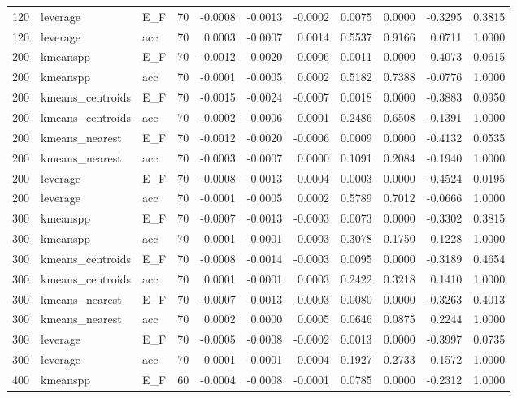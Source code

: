 \begin{table}
\begin{tabular}{rllrrrrrrrr}
120 & leverage & E\_F & 70 & -0.0008 & -0.0013 & -0.0002 & 0.0075 & 0.0000 & -0.3295 & 0.3815 \\
120 & leverage & acc & 70 & 0.0003 & -0.0007 & 0.0014 & 0.5537 & 0.9166 & 0.0711 & 1.0000 \\
200 & kmeanspp & E\_F & 70 & -0.0012 & -0.0020 & -0.0006 & 0.0011 & 0.0000 & -0.4073 & 0.0615 \\
200 & kmeanspp & acc & 70 & -0.0001 & -0.0005 & 0.0002 & 0.5182 & 0.7388 & -0.0776 & 1.0000 \\
200 & kmeans\_centroids & E\_F & 70 & -0.0015 & -0.0024 & -0.0007 & 0.0018 & 0.0000 & -0.3883 & 0.0950 \\
200 & kmeans\_centroids & acc & 70 & -0.0002 & -0.0006 & 0.0001 & 0.2486 & 0.6508 & -0.1391 & 1.0000 \\
200 & kmeans\_nearest & E\_F & 70 & -0.0012 & -0.0020 & -0.0006 & 0.0009 & 0.0000 & -0.4132 & 0.0535 \\
200 & kmeans\_nearest & acc & 70 & -0.0003 & -0.0007 & 0.0000 & 0.1091 & 0.2084 & -0.1940 & 1.0000 \\
200 & leverage & E\_F & 70 & -0.0008 & -0.0013 & -0.0004 & 0.0003 & 0.0000 & -0.4524 & 0.0195 \\
200 & leverage & acc & 70 & -0.0001 & -0.0005 & 0.0002 & 0.5789 & 0.7012 & -0.0666 & 1.0000 \\
300 & kmeanspp & E\_F & 70 & -0.0007 & -0.0013 & -0.0003 & 0.0073 & 0.0000 & -0.3302 & 0.3815 \\
300 & kmeanspp & acc & 70 & 0.0001 & -0.0001 & 0.0003 & 0.3078 & 0.1750 & 0.1228 & 1.0000 \\
300 & kmeans\_centroids & E\_F & 70 & -0.0008 & -0.0014 & -0.0003 & 0.0095 & 0.0000 & -0.3189 & 0.4654 \\
300 & kmeans\_centroids & acc & 70 & 0.0001 & -0.0001 & 0.0003 & 0.2422 & 0.3218 & 0.1410 & 1.0000 \\
300 & kmeans\_nearest & E\_F & 70 & -0.0007 & -0.0013 & -0.0003 & 0.0080 & 0.0000 & -0.3263 & 0.4013 \\
300 & kmeans\_nearest & acc & 70 & 0.0002 & 0.0000 & 0.0005 & 0.0646 & 0.0875 & 0.2244 & 1.0000 \\
300 & leverage & E\_F & 70 & -0.0005 & -0.0008 & -0.0002 & 0.0013 & 0.0000 & -0.3997 & 0.0735 \\
300 & leverage & acc & 70 & 0.0001 & -0.0001 & 0.0004 & 0.1927 & 0.2733 & 0.1572 & 1.0000 \\
400 & kmeanspp & E\_F & 60 & -0.0004 & -0.0008 & -0.0001 & 0.0785 & 0.0000 & -0.2312 & 1.0000 \\

\end{tabular}
\end{table}
